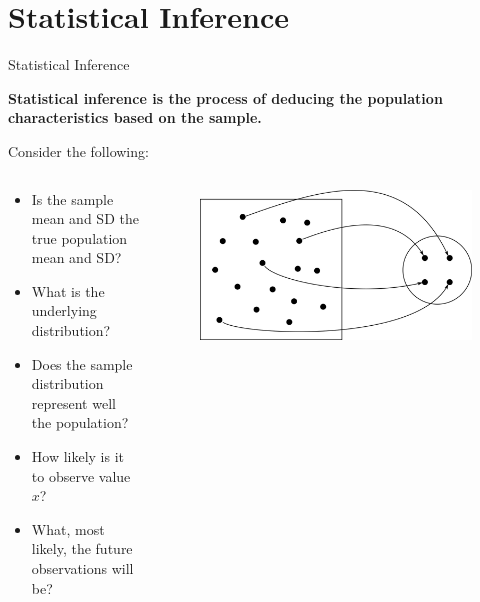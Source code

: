 \section{Statistical Inference}

\begin{frame}{Statistical Inference}

    \textbf{Statistical inference is the process of deducing the population characteristics based on the sample.}
    
    Consider the following:
    
    \begin{columns}
        \begin{column}{0.5\textwidth}
            {\scriptsize \begin{itemize}
                \item Is the sample mean and SD the true population mean and SD?
                \item What is the underlying distribution?
                \item Does the sample distribution represent well the population?
                \item How likely is it to observe value $x$?
                \item What, most likely, the future observations will be?
            \end{itemize}}
        \end{column}
        \begin{column}{0.5\textwidth}
            \begin{figure}
                \includegraphics[width=\textwidth]{gfx/random_sampling}
            \end{figure}
        \end{column}
    \end{columns}

\end{frame}

